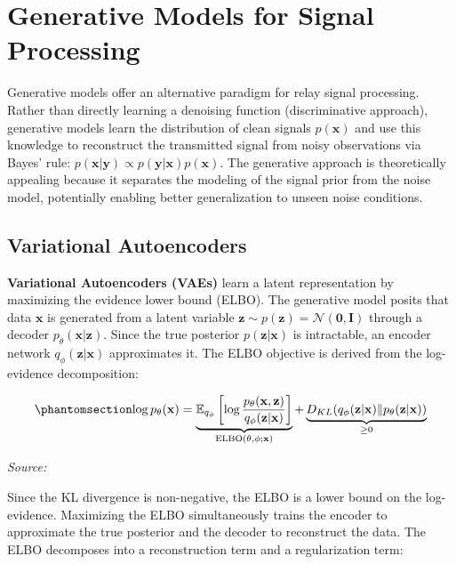 \section{Generative Models for Signal Processing}\label{sec:generative-models-for-signal-processing}

Generative models offer an alternative paradigm for relay signal processing. Rather than directly learning a denoising function (discriminative approach), generative models learn the distribution of clean signals \(p(\mathbf{x})\) and use this knowledge to reconstruct the transmitted signal from noisy observations via Bayes' rule: \(p(\mathbf{x} | \mathbf{y}) \propto p(\mathbf{y} | \mathbf{x}) p(\mathbf{x})\). The generative approach is theoretically appealing because it separates the modeling of the signal prior from the noise model, potentially enabling better generalization to unseen noise conditions.

\subsection{Variational Autoencoders}\label{sec:variational-autoencoders}

\textbf{Variational Autoencoders (VAEs)} \cite{kingma2014auto} learn a latent representation by maximizing the evidence lower bound (ELBO). The generative model posits that data \(\mathbf{x}\) is generated from a latent variable \(\mathbf{z} \sim p(\mathbf{z}) = \mathcal{N}(\mathbf{0}, \mathbf{I})\) through a decoder \(p_\theta(\mathbf{x} | \mathbf{z})\). Since the true posterior \(p(\mathbf{z} | \mathbf{x})\) is intractable, an encoder network \(q_\phi(\mathbf{z} | \mathbf{x})\) approximates it. The ELBO objective is derived from the log-evidence decomposition:

\begin{equation}\protect\phantomsection\label{eq:vae-elbo}{\log p_\theta(\mathbf{x}) = \underbrace{\mathbb{E}_{q_\phi}\left[\log \frac{p_\theta(\mathbf{x}, \mathbf{z})}{q_\phi(\mathbf{z} | \mathbf{x})}\right]}_{\text{ELBO}(\theta, \phi; \mathbf{x})} + \underbrace{D_{KL}(q_\phi(\mathbf{z} | \mathbf{x}) \| p_\theta(\mathbf{z} | \mathbf{x}))}_{\geq 0}
}\end{equation} \par{\small\textit{Source: \cite{kingma2014auto}}}

Since the KL divergence is non-negative, the ELBO is a lower bound on the log-evidence. Maximizing the ELBO simultaneously trains the encoder to approximate the true posterior and the decoder to reconstruct the data. The ELBO decomposes into a reconstruction term and a regularization term:

